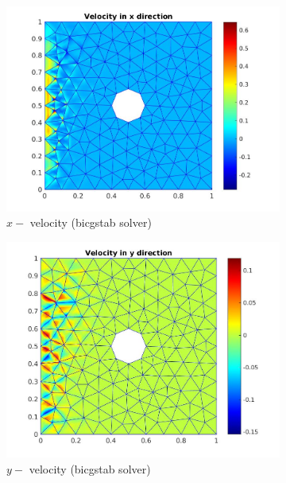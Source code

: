 \documentclass[a4paper]{book}
\begin{document}
\begin{figure}[H]
\begin{subfigure}{0.5\textwidth}	
  \includegraphics[width=\linewidth]{cylinder_bicgstab_vx.jpg}
  \caption{$x-$ velocity (bicgstab solver)}
  \label{x_vel_stoke_bicgstab}
\end{subfigure}
\begin{subfigure}{0.5\textwidth}	
  \includegraphics[width=\linewidth]{cylinder_bicgstab_vy.jpg}
  \caption{$y-$ velocity (bicgstab solver)}
  \label{y_vel_stoke_bicgstab}
\end{subfigure}
\begin{subfigure}{\textwidth}	

\end{subfigure}
\end{figure}
\end{document}
